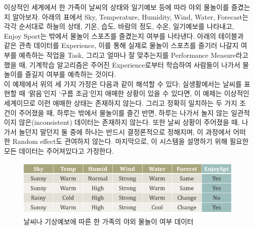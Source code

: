 \documentclass[a4paper]{oblivoir}
\begin{document}
\indent 이상적인 세계에서 한 가족이 날씨의 상태와 일기예보 등에 따라 야외 물놀이를 즐겼는지 알아보자. 아래의 표에서 Sky, Temperature, Humidity, Wind, Water, Forecast는 각각 순서대로 하늘의 상태, 기온, 습도, 바람의 정도, 수온, 일기예보를 나타내고, Enjoy Sport는 밖에서 물놀이 스포츠를 즐겼는지 여부를 나타낸다. 아래의 테이블과 같은 관측 데이터를 Experience, 이를 통해 실제로 물놀이 스포츠를 즐기러 나갈지 여부를 예측하는 작업을 Task, 그리고 얼마나 잘 맞추는지를 Performance Measure라고 했을 때, 기계학습 알고리즘은 주어진 Experience로부터 학습하여 사람들이 나가서 물놀이를 즐길지 여부를 예측하는 것이다. \\
\indent 이 예제에서 위의 세 가지 가정은 다음과 같이 해석할 수 있다; 실생활에서는 날씨를 표현할 때 `맑음'인지 `구름 조금'인지 애매한 상황이 있을 수 있다면, 이 예제는 이상적인 세계이므로 이런 애매한 상태는 존재하지 않는다. 그리고 정확히 일치하는 두 가지 조건이 주어졌을 때, 하루는 밖에서 물놀이를 즐긴 반면, 하루는 나가서 놀지 않는 일관적이지 않은(inconsistent) 데이터는 존재하지 않는다. 또한 날씨 상황이 주어졌을 때, 나가서 놀던지 말던지 둘 중에 하나는 반드시 결정론적으로 정해지며, 이 과정에서 어떠한 Random effect도 관여하지 않는다. 마지막으로, 이 시스템을 설명하기 위해 필요한 모든 데이터는 주어져있다고 가정한다.
\begin{figure}[ht]
\centering
\includegraphics[scale=0.5]{Table1.png}
\caption{날씨나 기상예보에 따른 한 가족의 야외 물놀이 여부 데이터}
\label{Figure 2-1}
\end{figure}

\end{document}

